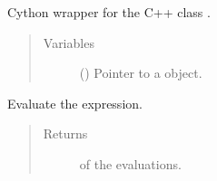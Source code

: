 \documentclass[letterpaper,10pt,english]{sphinxmanual}
\begin{document}
\begin{fulllineitems}
\label{\detokenize{api:tasmania.grids.parser.parser_1d.Parser1d}}
Cython wrapper for the C++ class .
\begin{quote}\begin{description}
\item[{Variables}] \leavevmode
{} () \textendash{} Pointer to a  object.

\end{description}\end{quote}

\begin{fulllineitems}
\label{\detokenize{api:tasmania.grids.parser.parser_1d.Parser1d.evaluate}}
Evaluate the expression.
\begin{quote}\begin{description}
\item[{Returns}] \leavevmode
{} of the evaluations.

\end{description}\end{quote}

\end{fulllineitems}


\end{fulllineitems}

\end{document}
